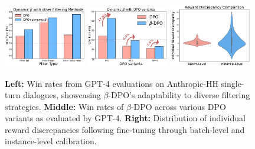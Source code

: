 \begin{figure}
    \centering
    \includegraphics[width=0.32\textwidth]{figs/filter_gradient.pdf}
    \includegraphics[width=0.32\textwidth]{figs/kto-sppo.pdf}
    \includegraphics[width=0.32\textwidth]{figs/gap_batch_instance.pdf}
    \caption{
    \textbf{Left:} Win rates from GPT-4 evaluations on Anthropic-HH single-turn dialogues, showcasing $\beta$-DPO's adaptability to diverse filtering strategies. \textbf{Middle:} Win rates of $\beta$-DPO across various DPO variants as evaluated by GPT-4. \textbf{Right:} Distribution of individual reward discrepancies following fine-tuning through batch-level and instance-level calibration.
    }
    
    \label{fig:gradient}
\end{figure}


